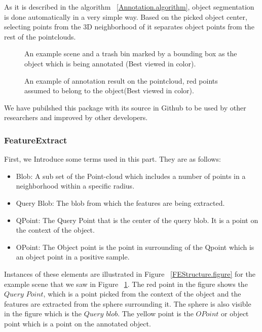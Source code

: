 As it is described in the algorithm ~\ref{Annotation.algorithm}, object segmentation is done automatically in a very 
simple way. Based on the picked object center, selecting points from the 3D neighborhood of it separates object points from the 
rest of the pointclouds.

\begin{figure}[t]
  \caption[Example scene and object for Annotation tool]
  {An example scene and a trash bin marked by a bounding box as the object which is being annotated (Best viewed in color).}
  \label{TrashbinBounding.figure}
\end{figure}

\begin{figure}[t]
  \caption[Annotation tool result]
  {An example of annotation result on the pointcloud, red points assumed to belong to the object(Best viewed in color).}
  \label{Annotation.figure}
\end{figure}

We have pubilshed this package with its source in Github to be used by other researchers and improved by other developers.\cite{AnnotationGithub}


\subsubsection{FeatureExtract}
\label{FeatureExtract.ssec}
First, we Introduce some terms used in this part. They are as follows:
\begin{itemize}
  \item Blob: A sub set of the Point-cloud which includes a number of points in a neighborhood within a specific radius.
  \item Query Blob: The blob from which the features are being extracted.
  \item QPoint: The Query Point that is the center of the query blob. It is a point on the context of the object.
  \item OPoint: The Object point is the point in surrounding of the Qpoint which is an object point in a positive sample.
 \end{itemize}
 
 Instances of these elements are illustrated in Figure ~\ref{FEStructure.figure} for the example scene that we saw in Figure 
 ~\ref{TrashbinBounding.figure}. 
 The red point in the figure shows the $Query$ $Point$, which is a point picked from the context of the object and the features are extracted from the sphere surrounding it. The sphere is also visible in the figure which is the 
$Query$ $blob$. 
 The yellow point is the $OPoint$ or object point which is a point on the annotated object. 
 

